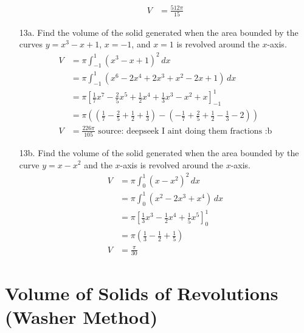 \documentclass[12pt]{article}
\begin{document}
\begin{enumerate}
\begin{align*}
        V&=\frac{512\pi}{15}
    \end{align*}
    \item[13a.]Find the volume of the solid generated when the area bounded by the curves \( y = x^3 - x + 1 \), \( x = -1 \), and \( x = 1 \) is revolved around the \( x \)-axis.
    \begin{align*}
        V &= \pi \int_{-1}^{1} (x^3 - x + 1)^2 \, dx \\
        &= \pi \int_{-1}^{1} (x^6 - 2x^4 + 2x^3 + x^2 - 2x + 1) \, dx \\
        &= \pi \left[ \frac{1}{7}x^7 - \frac{2}{5}x^5 + \frac{1}{2}x^4 + \frac{1}{3}x^3 - x^2 + x \right]_{-1}^{1} \\
        &= \pi \left( \left( \frac{1}{7} - \frac{2}{5} + \frac{1}{2} + \frac{1}{3} \right) - \left( -\frac{1}{7} + \frac{2}{5} + \frac{1}{2} - \frac{1}{3} - 2 \right) \right) \\
       V &=\frac{226\pi}{105} \text{ source: deepseek I aint doing them fractions :b}
    \end{align*}
    \item[13b.]Find the volume of the solid generated when the area bounded by the curve \( y = x - x^2 \) and the \( x \)-axis is revolved around the \( x \)-axis.
    \begin{align*}
        V&= \pi \int_{0}^{1} (x - x^2)^2 \, dx \\
        &= \pi \int_{0}^{1} (x^2 - 2x^3 + x^4) \, dx \\
        &= \pi \left[ \frac{1}{3}x^3 - \frac{1}{2}x^4 + \frac{1}{5}x^5 \right]_{0}^{1} \\
        &= \pi \left( \frac{1}{3} - \frac{1}{2} + \frac{1}{5} \right) \\
        V&=\frac{\pi}{30}
    \end{align*}
\end{enumerate}

\newpage
\section{Volume of Solids of Revolutions (Washer Method)}
\end{document}

